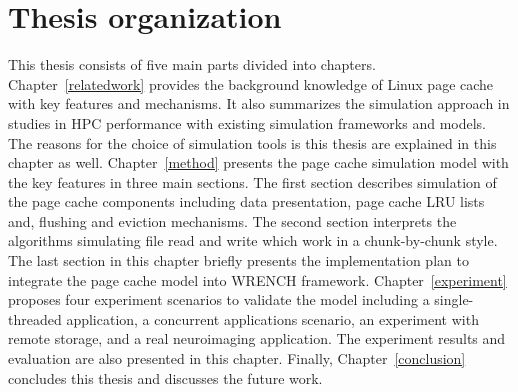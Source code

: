 \section{Thesis organization}
This thesis consists of five main parts divided into chapters.
Chapter~\ref{relatedwork} provides the background knowledge of Linux page cache 
with key features and mechanisms. 
It also summarizes the simulation approach in studies in HPC performance with 
existing simulation frameworks and models. 
The reasons for the choice of simulation tools is this thesis are explained in this 
chapter as well.
Chapter~\ref{method} presents the page cache simulation model with the key features 
in three main sections.
The first section describes simulation of the page cache components including data 
presentation, page cache LRU lists and, flushing and eviction mechanisms.
The second section interprets the algorithms simulating file read and write which work 
in a chunk-by-chunk style.
The last section in this chapter briefly presents the implementation plan to integrate 
the page cache model into WRENCH framework.
Chapter~\ref{experiment} proposes four experiment scenarios to validate the model
including a single-threaded application, a concurrent applications scenario, an experiment 
with remote storage, and a real neuroimaging application. 
The experiment results and evaluation are also presented in this chapter. 
Finally, Chapter~\ref{conclusion} concludes this thesis and discusses the future work. 

